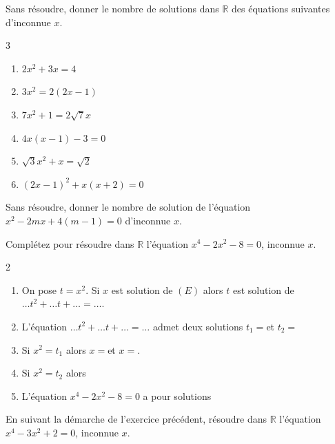 \documentclass[main.tex]{subfiles}
\begin{document}
\begin{exercise} Sans  résoudre, donner le nombre de solutions dans $\mathbb{R}$ des équations suivantes d'inconnue $x$.	
	\vspace{-1em}
	\begin{multicols}{3}
		\begin{enumerate}[label={$(E_{\arabic*})$}, leftmargin=*]
			\item $2x^2+3x=4$ 
			\item $3x^2=2(2x-1)$ 
			\item $7x^2+1=2\sqrt{7}x$ 
			\item $4x(x-1)-3=0$
			\item $\sqrt{3}x^2+x=\sqrt{2}$
			\item $(2x-1)^2+x(x+2)=0$
		\end{enumerate} 
	\end{multicols}   
\end{exercise}\vspace{-0.5em} 
\begin{exercise}  Sans  résoudre,  donner le nombre de solution de l'équation   $x^2-2mx+4(m-1)=0$ d'inconnue $x$.
\end{exercise} 
\begin{exercise}  Complétez pour résoudre  dans $\mathbb{R}$ l'équation $x^4-2x^2-8=0$, inconnue $x$.\vspace{-1em} 
\begin{spacing}{2}
	\begin{enumerate}[label={},leftmargin=*]
		\item  	On pose $t=x^2$. Si $x$ est solution de $(E)$ alors $t$ est solution de $\ldots t^2+\ldots t+ \ldots =\ldots$.
		\item L'équation $\ldots t^2+\ldots t+ \ldots =\ldots$ admet deux solutions $t_1=$\dotfill et $t_2=$\dotfill
		\item Si $x^2=t_1$ alors $x=$\dotfill et $x=$\dotfill.
		\item Si $x^2=t_2$ alors \dotfill 
		\item L'équation $x^4-2x^2-8=0$ a pour solutions \dotfill 
	\end{enumerate} 
\end{spacing}\vspace{-1em}  
\end{exercise} 
\begin{exercise} 
En suivant la démarche de l'exercice précédent, résoudre dans $\mathbb{R}$ l'équation $x^4-3x^2+2=0$, inconnue $x$.
\end{exercise}
\end{document}
